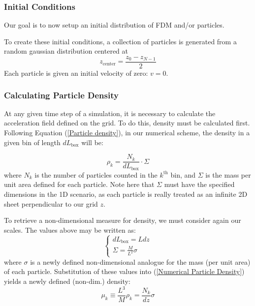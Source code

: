 \documentclass{article}
\begin{document}

\subsubsection{Initial Conditions}
Our goal is to now setup an initial distribution of FDM and/or particles.

To create these initial conditions, a collection of particles is generated from a random gaussian distribution centered at 
$$z_\text{center} = \frac{z_0 -z_{N-1}}{2} $$
Each particle is given an initial velocity of zero: $v = 0$.

\subsubsection{Calculating Particle Density}
At any given time step of a simulation, it is necessary to calculate the acceleration field defined on the grid. To do this, density must be calculated first. Following Equation (\ref{Particle density}), in our numerical scheme, the density in a given bin of length $d L_\text{box}$ will be:

\begin{equation}
\rho_k = \frac{N_k}{d L_\text{box}}\cdot \Sigma
\label{Numerical Particle Density}
\end{equation}
where $N_k$ is the number of particles counted in the $k^\text{th}$ bin, and $\Sigma$ is the mass per unit area defined for each particle. Note here that $\Sigma$ must have the specified dimensions in the 1D scenario, as each particle is really treated as an infinite 2D sheet perpendicular to our grid $z$. 

To retrieve a non-dimensional measure for density, we must consider again our scales. The values above may be written as:
\begin{equation*}
    \begin{cases}
    d L_\text{box} = L dz \\
    \Sigma = \frac{M}{L^2} \sigma
    \end{cases}
\end{equation*}
where $\sigma$ is a newly defined non-dimensional analogue for the mass (per unit area) of each particle. Substitution of these values into (\ref{Numerical Particle Density}) yields a newly defined (non-dim.) density:
$$\mu_k \equiv \frac{L^3}{M} \rho_k = \frac{N_k}{dz}\sigma$$
\end{document}
